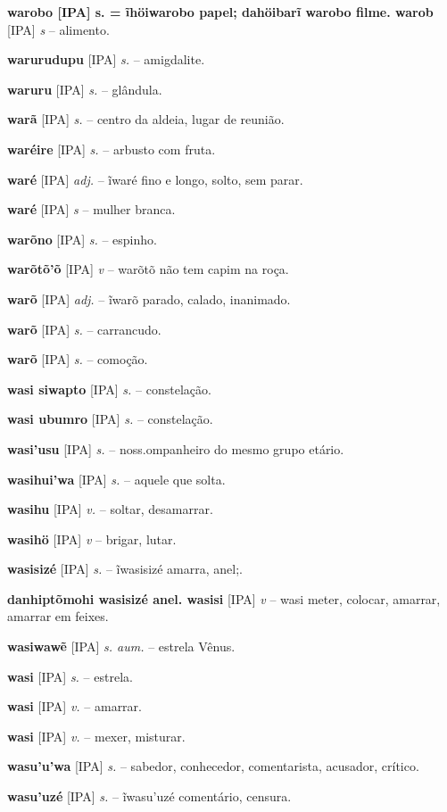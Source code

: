 \textbf{warobo [IPA] s. = ĩhöiwarobo papel; dahöibarĩ warobo filme. warob} [IPA] \textit{s} -- {alimento}.

\textbf{warurudupu} [IPA] \textit{s.} -- amigdalite.

\textbf{waruru} [IPA] \textit{s.} -- glândula.

\textbf{warã} [IPA] \textit{s.} -- centro da aldeia, lugar de reunião.

\textbf{waréire} [IPA] \textit{s.} -- arbusto com fruta.

\textbf{waré} [IPA] \textit{adj.} -- ĩwaré fino e longo, solto, sem parar.

\textbf{waré} [IPA] \textit{s} -- {mulher branca}.

\textbf{warõno} [IPA] \textit{s.} -- espinho.

\textbf{warõtõ'õ} [IPA] \textit{v} -- warõtõ não tem capim na roça.

\textbf{warõ} [IPA] \textit{adj.} -- ĩwarõ parado, calado, inanimado.

\textbf{warõ} [IPA] \textit{s.} -- carrancudo.

\textbf{warõ} [IPA] \textit{s.} -- comoção.

\textbf{wasi siwapto} [IPA] \textit{s.} -- constelação.

\textbf{wasi ubumro} [IPA] \textit{s.} -- constelação.

\textbf{wasi'usu} [IPA] \textit{s.} -- noss.ompanheiro do mesmo grupo etário.

\textbf{wasihui'wa} [IPA] \textit{s.} -- aquele que solta.

\textbf{wasihu} [IPA] \textit{v.} -- soltar, desamarrar.

\textbf{wasihö} [IPA] \textit{v} -- {brigar, lutar}.

\textbf{wasisizé} [IPA] \textit{s.} -- ĩwasisizé amarra, anel;.

\textbf{danhiptõmohi wasisizé anel. wasisi} [IPA] \textit{v} -- wasi meter, colocar, amarrar, amarrar em feixes.

\textbf{wasiwawẽ} [IPA] \textit{s. aum.} -- estrela Vênus.

\textbf{wasi} [IPA] \textit{s.} -- estrela.

\textbf{wasi} [IPA] \textit{v.} -- amarrar.

\textbf{wasi} [IPA] \textit{v.} -- mexer, misturar.

\textbf{wasu'u'wa} [IPA] \textit{s.} -- sabedor, conhecedor, comentarista, acusador, crítico.

\textbf{wasu'uzé} [IPA] \textit{s.} -- ĩwasu'uzé comentário, censura.

